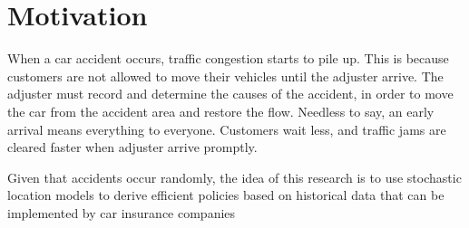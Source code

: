 \section{Motivation}
When a car accident occurs,
traffic congestion starts to pile up.
This is because
customers are not allowed
to move their vehicles until
the adjuster arrive.
The adjuster must record and determine
the causes of the accident,
in order to
move the car from the accident area
and restore the flow.
Needless to say,
an early arrival
means everything to everyone.
Customers wait less,
and traffic jams
are cleared faster
when adjuster arrive promptly.

Given that accidents occur randomly,
the idea of this research
is to use stochastic location models
to derive efficient policies
based on historical data
that can be implemented
by car insurance companies


